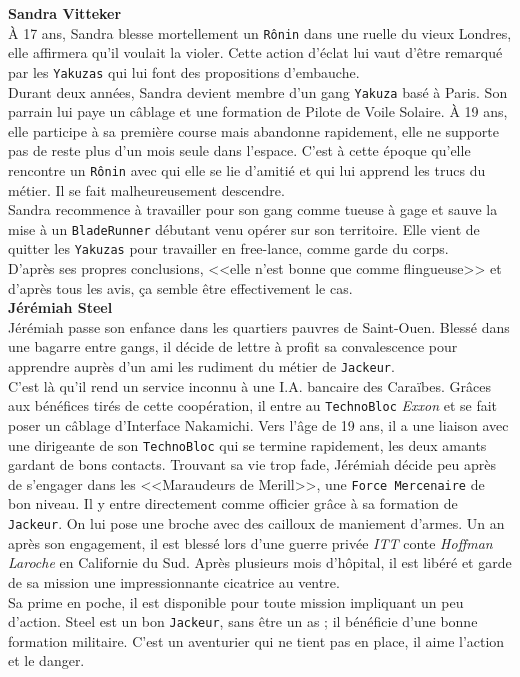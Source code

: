 \documentclass[11pt,twoside,a4paper]{article}
\begin{document}
\begin{multicols}{2}
	\textbf{Sandra Vitteker}~\\
	{\`A} 17 ans, Sandra blesse mortellement un \texttt{R{\^o}nin} dans une ruelle du vieux Londres, elle affirmera qu'il voulait la violer. Cette action d'{\'e}clat lui vaut d'{\^e}tre remarqu{\'e} par les \texttt{Yakuzas} qui lui font des propositions d'embauche. ~\\
	Durant deux ann{\'e}es, Sandra devient membre d'un gang \texttt{Yakuza} bas{\'e} {\`a} Paris. Son parrain lui paye un c{\^a}blage et une formation de Pilote de Voile Solaire. {\`A} 19 ans, elle participe {\`a} sa premi{\`e}re course mais abandonne rapidement, elle ne supporte pas de reste plus d'un mois seule dans l'espace. C'est {\`a} cette {\'e}poque qu'elle rencontre un \texttt{R{\^o}nin} avec qui elle se lie d'amiti{\'e} et qui lui apprend les trucs du m{\'e}tier. Il se fait malheureusement descendre. ~\\
	Sandra recommence {\`a} travailler pour son gang comme tueuse {\`a} gage et sauve la mise {\`a} un \texttt{BladeRunner} d{\'e}butant venu op{\'e}rer sur son territoire. Elle vient de quitter les \texttt{Yakuzas} pour travailler en free-lance, comme garde du corps. ~\\
	D'apr{\`e}s ses propres conclusions, <<elle n'est bonne que comme flingueuse>> et d'apr{\`e}s tous les avis, \c{c}a semble {\^e}tre effectivement le cas. ~\\
	
	\textbf{J{\'e}r{\'e}miah Steel}~\\
	J{\'e}r{\'e}miah passe son enfance dans les quartiers pauvres de Saint-Ouen. Bless{\'e} dans une bagarre entre gangs, il d{\'e}cide de lettre {\`a} profit sa convalescence pour apprendre aupr{\`e}s d'un ami les rudiment du m{\'e}tier de \texttt{Jackeur}. ~\\
	C'est l{\`a} qu'il rend un service inconnu {\`a} une I.A. bancaire des Cara{\"i}bes. Gr{\^a}ces aux b{\'e}n{\'e}fices tir{\'e}s de cette coop{\'e}ration, il entre au \texttt{TechnoBloc} \emph{Exxon} et se fait poser un c{\^a}blage d'Interface Nakamichi. Vers l'{\^a}ge de 19 ans, il a une liaison avec une dirigeante de son \texttt{TechnoBloc} qui se termine rapidement, les deux amants gardant de bons contacts. Trouvant sa vie trop fade, J{\'e}r{\'e}miah d{\'e}cide peu apr{\`e}s de s'engager dans les <<Maraudeurs de Merill>>, une \texttt{Force Mercenaire} de bon niveau. Il y entre directement comme officier gr{\^a}ce {\`a} sa formation de \texttt{Jackeur}. On lui pose une broche avec des cailloux de maniement d'armes. Un an apr{\`e}s son engagement, il est bless{\'e} lors d'une guerre priv{\'e}e \emph{ITT} conte \emph{Hoffman Laroche} en Californie du Sud. Apr{\`e}s plusieurs mois d'h{\^o}pital, il est lib{\'e}r{\'e} et garde de sa mission une impressionnante cicatrice au ventre. ~\\
	Sa prime en poche, il est disponible pour toute mission impliquant un peu d'action. Steel est un bon \texttt{Jackeur}, sans {\^e}tre un as ; il b{\'e}n{\'e}ficie d'une bonne formation militaire. C'est un aventurier qui ne tient pas en place, il aime l'action et le danger. ~\\
	

\end{multicols}
\end{document}
